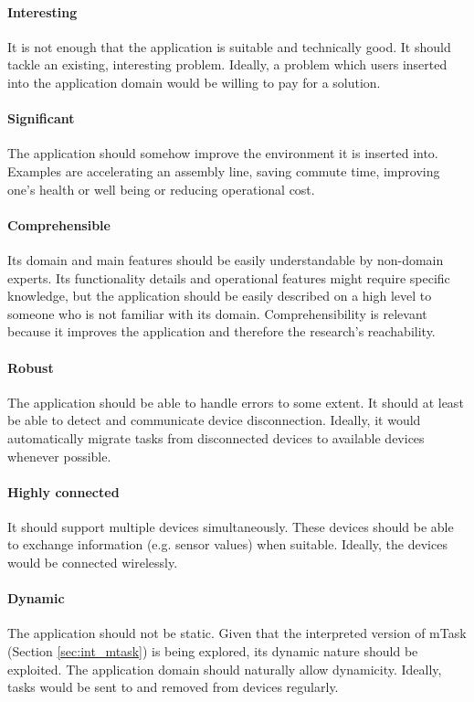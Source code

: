 \paragraph{Interesting} It is not enough that the application is suitable and technically good. It should tackle an existing, interesting problem. Ideally, a problem which users inserted into the application domain would be willing to pay for a solution.

\paragraph{Significant} The application should somehow improve the environment it is inserted into. Examples are accelerating an assembly line, saving commute  time, improving one's health or well being or reducing operational cost.

\paragraph{Comprehensible} Its domain and main features should be easily understandable by non-domain experts. Its functionality details and operational features might require specific knowledge, but the application should be easily described on a high level to someone who is not familiar with its domain. Comprehensibility is relevant because it improves the application and therefore the research's reachability. 

\paragraph{Robust} The application should be able to handle errors to some extent. It should at least be able to detect and communicate device disconnection. Ideally, it would automatically migrate tasks from disconnected devices to available devices whenever possible. 

\paragraph{Highly connected} It should support multiple devices simultaneously. These devices should be able to exchange information (e.g. sensor values) when suitable. Ideally, the devices would be connected wirelessly.

\paragraph{Dynamic} The application should not be static. Given that the interpreted version of \gls{mTask} (Section \ref{sec:int_mtask}) is being explored, its dynamic nature should be exploited. The application domain should naturally allow dynamicity. Ideally, tasks would be sent to and removed from devices regularly.

